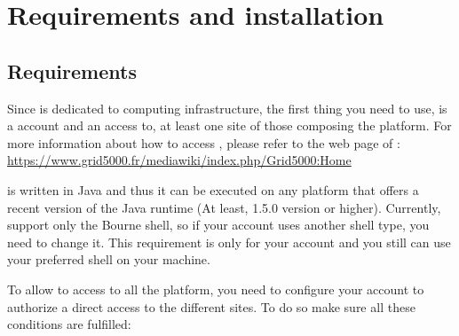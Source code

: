 \chapter{Requirements and installation}

\section{Requirements}

Since \grudu is dedicated to \gfk computing infrastructure, the
first thing you need to use, is a \gfk account and an access to, at
least one site of those composing the platform. For more information about
how to access \gfk, please refer to the web page of \gfk : \url{https://www.grid5000.fr/mediawiki/index.php/Grid5000:Home}

\grudu is written in Java and thus it can be executed on any platform
that offers a recent version of the Java runtime (At least, 1.5.0 version or higher).
Currently, \grudu support only the Bourne shell, so if your \gfk account uses
another shell type, you need to change it. This requirement is only for your \gfk
account and you still can use your preferred shell on your machine.

To allow \grudu to access to all the platform, you need to configure your 
account to authorize a direct access to the different sites. To do so make 
sure all these conditions are fulfilled:

